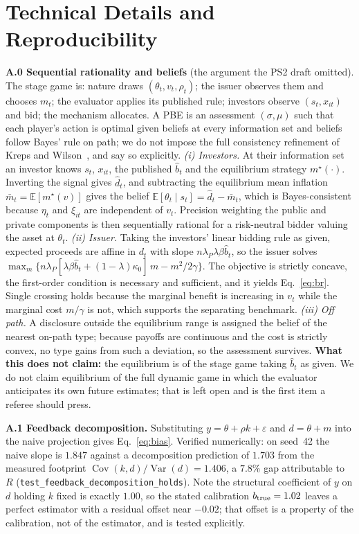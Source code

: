 \section{Technical Details and Reproducibility}
\textbf{A.0 Sequential rationality and beliefs} (the argument the PS2 draft omitted). The stage game is: nature draws $(\theta_t,v_t,\rho_t)$; the issuer observes them and chooses $m_t$; the evaluator applies its published rule; investors observe $(s_t,x_{it})$ and bid; the mechanism allocates. A PBE is an assessment $(\sigma,\mu)$ such that each player's action is optimal given beliefs at every information set and beliefs follow Bayes' rule on path; we do not impose the full consistency refinement of Kreps and Wilson~\cite{kreps1982}, and say so explicitly.
\emph{(i) Investors.} At their information set an investor knows $s_t$, $x_{it}$, the published $\hat b_t$ and the equilibrium strategy $m^\star(\cdot)$. Inverting the signal gives $\hat d_t$, and subtracting the equilibrium mean inflation $\bar m_t=\mathbb{E}[m^\star(v)]$ gives the belief $\mathbb{E}[\theta_t\mid s_t]=\hat d_t-\bar m_t$, which is Bayes-consistent because $\eta_t$ and $\xi_{it}$ are independent of $v_t$. Precision weighting the public and private components is then sequentially rational for a risk-neutral bidder valuing the asset at $\theta_t$.
\emph{(ii) Issuer.} Taking the investors' linear bidding rule as given, expected proceeds are affine in $d_t$ with slope $n\lambda_P\lambda\beta\hat b_t$, so the issuer solves $\max_m \{n\lambda_P[\lambda\beta\hat b_t+(1-\lambda)\kappa_0]\,m-m^2/2\gamma\}$. The objective is strictly concave, the first-order condition is necessary and sufficient, and it yields Eq.~\eqref{eq:br}. Single crossing holds because the marginal benefit is increasing in $v_t$ while the marginal cost $m/\gamma$ is not, which supports the separating benchmark.
\emph{(iii) Off path.} A disclosure outside the equilibrium range is assigned the belief of the nearest on-path type; because payoffs are continuous and the cost is strictly convex, no type gains from such a deviation, so the assessment survives. \textbf{What this does not claim:} the equilibrium is of the stage game taking $\hat b_t$ as given. We do not claim equilibrium of the full dynamic game in which the evaluator anticipates its own future estimates; that is left open and is the first item a referee should press.

\textbf{A.1 Feedback decomposition.} Substituting $y=\theta+\rho k+\varepsilon$ and $d=\theta+m$ into the naive projection gives Eq.~\eqref{eq:bias}. Verified numerically: on seed~42 the naive slope is $1.847$ against a decomposition prediction of $1.703$ from the measured footprint $\operatorname{Cov}(k,d)/\operatorname{Var}(d)=1.406$, a $7.8\%$ gap attributable to $R$ (\texttt{test\_feedback\_decomposition\_holds}). Note the structural coefficient of $y$ on $d$ holding $k$ fixed is exactly $1.00$, so the stated calibration $b_{\rm true}=1.02$ leaves a perfect estimator with a residual offset near $-0.02$; that offset is a property of the calibration, not of the estimator, and is tested explicitly.

